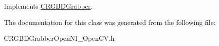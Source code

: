 Implements \hyperlink{class_c_r_g_b_d_grabber_a653ef16978adcd9000079f0e5f00addc}{CRGBDGrabber}.



The documentation for this class was generated from the following file:\begin{DoxyCompactItemize}
\item 
CRGBDGrabberOpenNI\_\-OpenCV.h\end{DoxyCompactItemize}
